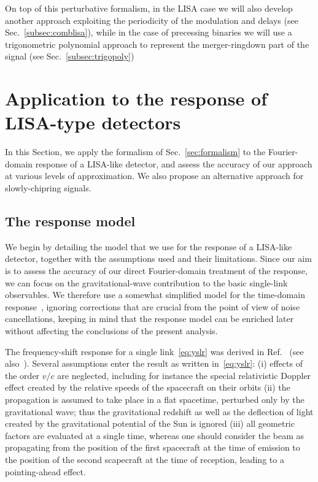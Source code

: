 \documentclass[aps,showpacs,twocolumn,
prd,superscriptaddress,nofootinbib]{revtex4-1}
\begin{document}
On top of this perturbative formalism, in the LISA case we will also develop another approach exploiting the periodicity of the modulation and delays (see Sec.~\ref{subsec:comblisa}), while in the case of precessing binaries we will use a trigonometric polynomial approach to represent the merger-ringdown part of the signal (see Sec.~\ref{subsec:trigopoly})


\section{Application to the response of LISA-type detectors}
\label{sec:LISA}

In this Section, we apply the formalism of Sec.~\ref{sec:formalism} to the Fourier-domain response of a LISA-like detector, and assess the accuracy of our approach at various levels of approximation. We also propose an alternative approach for slowly-chipring signals. 


\subsection{The response model}
\label{subsec:modelLISA}

We begin by detailing the model that we use for the response of a LISA-like detector, together with the assumptions used and their limitations. Since our aim is to assess the accuracy of our direct Fourier-domain treatment of the response, we can focus on the gravitational-wave contribution to the basic single-link observables. We therefore use a somewhat simplified model for the time-domain response~\cite{Krolak+04}, ignoring corrections that are crucial from the point of view of noise cancellations, keeping in mind that the response model can be enriched later without affecting the conclusions of the present analysis.

The frequency-shift response for a single link~\eqref{eq:yslr} was derived in Ref.~\cite{EW75} (see also~\cite{CR02, RCP04, Finn08, Cornish09}). Several assumptions enter the result as written in~\eqref{eq:yslr}: (i) effects of the order $v/c$ are neglected, including for instance the special relativistic Doppler effect created by the relative speeds of the spacecraft on their orbits (ii) the propagation is assumed to take place in a flat spacetime, perturbed only by the gravitational wave; thus the gravitational redshift as well as the deflection of light created by the gravitational potential of the Sun is ignored (iii) all geometric factors are evaluated at a single time, whereas one should consider the beam as propagating from the position of the first spacecraft at the time of emission to the position of the second scapecraft at the time of reception, leading to a pointing-ahead effect.
\end{document}
